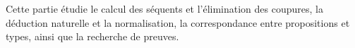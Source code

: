 \documentclass[../../include/open-logic-part]{subfiles}
\begin{document}
\begin{OLPartNotice}{}
Cette partie étudie le calcul des séquents et l'élimination des
coupures, la déduction naturelle et la normalisation, la correspondance
entre propositions et types, ainsi que la recherche de preuves.
\end{OLPartNotice}


\OLEndPartHook
\end{document}
